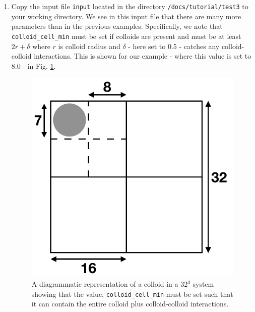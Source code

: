 \documentclass[11pt,twoside,a4paper]{article}
\begin{document}
\begin{enumerate}
\item Copy the input file \texttt{input} located in the directory 
\texttt{/docs/tutorial/test3} to your working directory. We see in this input file that 
there are many more parameters 
than in the previous examples. Specifically, we note that \texttt{colloid\_cell\_min} 
must be set if colloids are present and must be at least $2r + \delta$ where $r$ is colloid 
radius and $\delta$ - here set to 0.5 - catches any colloid-colloid interactions. This is shown for our example - where this value is set to 8.0 - in Fig. \ref{fig:colloid_int}.

 \begin{figure}[H]
\begin{center}
\includegraphics[width=0.5\linewidth]{colloidInit.png}
  \caption{A diagrammatic representation of a colloid in a 32$^3$ system showing that the value, \texttt{colloid\_cell\_min} must be set such that it can contain the entire colloid plus colloid-colloid interactions.}
  \label{fig:colloid_int}
  \end{center}
\end{figure}


\end{enumerate}
\end{document}
